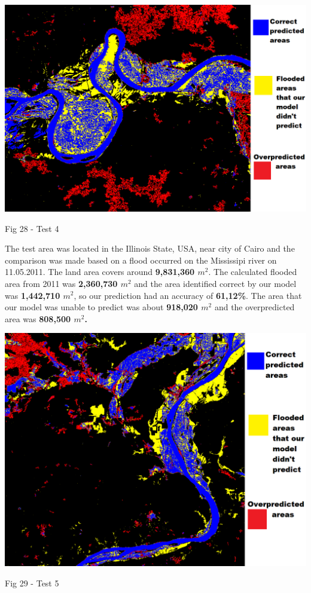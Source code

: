 \documentclass[12pt, a4paper]{report}
\begin{document}
\bigskip
\includegraphics[scale=0.5, center]{test_4.png}
\begin{center}
Fig 28 - Test 4 
\end{center}
\par 

The test area was located in the Illinois State, USA, near city of Cairo and the comparison was made based on a flood occurred on the Mississipi river on 11.05.2011. The land area covers around \textbf{9,831,360 $m^2$}. The calculated flooded area from 2011 was \textbf{2,360,730 $m^2$} and the area identified correct by our model was \textbf{1,442,710 $m^2$}, so our prediction had an accuracy of \textbf{61,12\%}. The area that our model was unable to predict was about \textbf{918,020 $m^2$} and the overpredicted area was \textbf{808,500 $m^2$.}

\newpage

\bigskip
\includegraphics[scale=0.5, center]{test_5.png}
\begin{center}
Fig 29 - Test 5
\end{center}
\par 
\end{document}
